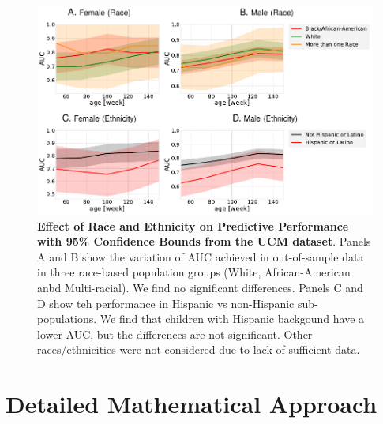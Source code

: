 \documentclass[onecolumn,,10pt]{IEEEtran}
\renewcommand{\captionN}[1]{\caption{\color{CadetBlue4!80!black} \sffamily \fontsize{9}{10}\selectfont #1  }}
\newif\ifFIGS
\begin{document}
\ifFIGS
\begin{figure}[!ht]
  \centering
  \includegraphics[width=\textwidth]{Figures/raceeth}

  \captionN{\textbf{Effect of Race and Ethnicity on Predictive Performance with 95\% Confidence Bounds from the UCM dataset}. Panels A and B show the variation of AUC achieved in out-of-sample data in three race-based population groups (White, African-American anbd Multi-racial). We find no significant differences. Panels C and D show teh performance in Hispanic vs non-Hispanic sub-populations. We find that children with Hispanic backgound have a lower AUC, but the differences are not significant. Other races/ethnicities were not considered due to lack of sufficient data. }\label{figrace}
    \vspace{-5pt}

\end{figure}

\section{Detailed Mathematical Approach}\label{sec:mathdetails}
 
\end{document}
